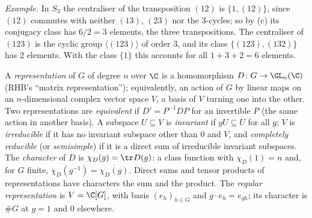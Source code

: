 \emph{Example.} In $S_3$ the centraliser of the transposition $(12)$ is $\{1,(12)\}$, since $(12)$
commutes with neither $(13)$, $(23)$ nor the $3$-cycles; so by (c) its conjugacy class has $6/2=3$
elements, the three transpositions. The centraliser of $(123)$ is the cyclic group
$\langle(123)\rangle$ of order $3$, and its class $\{(123),(132)\}$ has $2$ elements. With the class
$\{1\}$ this accounts for all $1+3+2=6$ elements.

\begin{definition}\label{def:prereq:reps}
A \emph{representation} of $G$ of degree $n$ over $\C$ is a homomorphism $D\colon G\to\GL_n(\C)$
(RHB's ``matrix representation''); equivalently, an action of $G$ by linear maps on an
$n$-dimensional complex vector space $V$, a basis of $V$ turning one into the other. Two
representations are \emph{equivalent} if $D'=P^{-1}DP$ for an invertible $P$ (the same action in
another basis). A subspace $U\subseteq V$ is \emph{invariant} if $gU\subseteq U$ for all $g$; $V$ is
\emph{irreducible} if it has no invariant subspace other than $0$ and $V$, and \emph{completely
reducible} (or \emph{semisimple}) if it is a direct sum of irreducible invariant subspaces. The
\emph{character} of $D$ is $\chi_D(g)=\tr D(g)$: a class function with $\chi_D(1)=n$ and, for $G$
finite, $\chi_D(g^{-1})=\overline{\chi_D(g)}$. Direct sums and tensor products of representations
have characters the sum and the product. The \emph{regular representation} is $V=\C[G]$, with basis
$(e_h)_{h\in G}$ and $g\cdot e_h=e_{gh}$; its character is $\#G$ at $g=1$ and $0$ elsewhere.
\end{definition}


